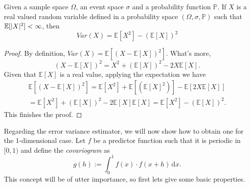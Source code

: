 \begin{Prop}
    Given a sample space $\Omega$, an event space $\sigma$  and a probability function $\mathbb{P}$. If $X$ is a real valued random variable defined in a probability space $(\Omega,\sigma,\mathbb{P})$ such that $\mathbb{E}[\lvert X\rvert^2]<\infty$, then
    \begin{equation*}
        Var(X)=\mathbb{E}[X^2]-(\mathbb{E}[X])^2
    \end{equation*}
\end{Prop}
\begin{proof} By definition, $Var(X)=\mathbb{E}[(X-\mathbb{E}[X])^2]$. What's more, $$ (X-\mathbb{E}[X])^2 = X^2 + (\mathbb{E}[X])^2 - 2X\mathbb{E}[X]. $$
Given that $\mathbb{E}[X]$ is a real value, applying the expectation we have
\begin{multline*}
    \mathbb{E}[(X-\mathbb{E}[X])^2] = \mathbb{E}[X^2] + \mathbb{E}[(\mathbb{E}[X]^2)] - \mathbb{E}[2X\mathbb{E}[X]] \\ = \mathbb{E}[X^2] + (\mathbb{E}[X])^2 - 2\mathbb{E}[X]\mathbb{E}[X] = \mathbb{E}[X^2] - (\mathbb{E}[X])^2.
\end{multline*}
This finishes the proof.
\end{proof}
\vspace{2mm}


Regarding the error variance estimator, we will now show how to obtain one for the 1-dimensional case. Let $f$ be a predictor function such that it is periodic in $[0,1)$  %
and define the \textit{covariogram} as
\begin{equation} \label{eqCovariograma}
    g(h) := \int_0^1 f(x) \cdot f(x+h) \,\mathrm{d}x.
\end{equation}
This concept will be of utter importance, so first lets give some basic properties.\\

